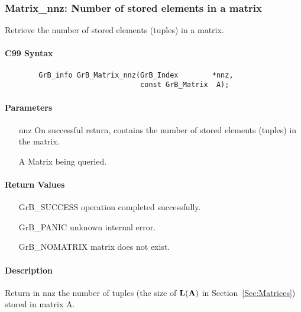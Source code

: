 \subsubsection{{\sf Matrix\_nnz}: Number of stored elements in a matrix}

Retrieve the number of stored elements (tuples) in a matrix.

\paragraph{C99 Syntax}

\begin{verbatim}
        GrB_info GrB_Matrix_nnz(GrB_Index        *nnz,
                                const GrB_Matrix  A);
\end{verbatim}

\paragraph{Parameters}

\begin{itemize}[leftmargin=1.1in]
    \item[{\sf nnz}] On successful return, contains the number of stored elements (tuples) 
    in the matrix.
    \item[{\sf A}] Matrix being queried.
\end{itemize}

\paragraph{Return Values}

\begin{itemize}[leftmargin=2.1in]
\item[{\sf GrB\_SUCCESS}]   operation completed successfully.
\item[{\sf GrB\_PANIC}]     unknown internal error.
\item[{\sf GrB\_NOMATRIX}]  matrix does not exist.
\end{itemize}

\paragraph{Description}

Return in {\sf nnz} the number of tuples (the size of $\bold{L}({\bf A})$
in Section~\ref{Sec:Matrices}) stored in matrix {\sf A}.
